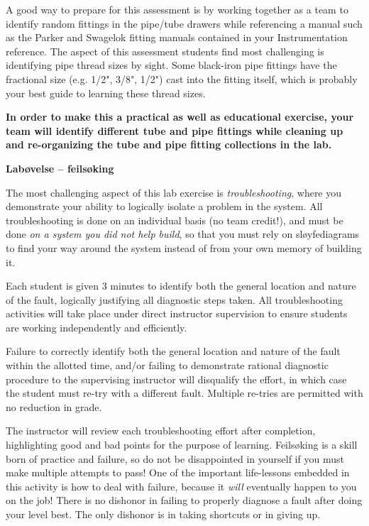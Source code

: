{{\vskip 10pt

A good way to prepare for this assessment is by working together as a team to identify random fittings in the pipe/tube drawers while referencing a manual such as the Parker and Swagelok fitting manuals contained in your Instrumentation reference.  The aspect of this assessment students find most challenging is identifying pipe thread sizes by sight.  Some black-iron pipe fittings have the fractional size (e.g. 1/2", 3/8", 1/2") cast into the fitting itself, which is probably your best guide to learning these thread sizes.

\vskip 10pt

{\bf In order to make this a practical as well as educational exercise, your team will identify different tube and pipe fittings while cleaning up and re-organizing the tube and pipe fitting collections in the lab.}  

\vskip 10pt






\vfil \eject

\noindent
{\bf Labøvelse -- feilsøking}

\vskip 5pt

The most challenging aspect of this lab exercise is {\it troubleshooting}, where you demonstrate your ability to logically isolate a problem in the system.  All troubleshooting is done on an individual basis (no team credit!), and must be done {\it on a system you did not help build}, so that you must rely on sløyfediagrams to find your way around the system instead of from your own memory of building it.

Each student is given 3 minutes to identify both the general location and nature of the fault, logically justifying all diagnostic steps taken.  All troubleshooting activities will take place under direct instructor supervision to ensure students are working independently and efficiently. 

Failure to correctly identify both the general location and nature of the fault within the allotted time, and/or failing to demonstrate rational diagnostic procedure to the supervising instructor will disqualify the effort, in which case the student must re-try with a different fault.  Multiple re-tries are permitted with no reduction in grade.

The instructor will review each troubleshooting effort after completion, highlighting good and bad points for the purpose of learning.  Feilsøking is a skill born of practice and failure, so do not be disappointed in yourself if you must make multiple attempts to pass!  One of the important life-lessons embedded in this activity is how to deal with failure, because it {\it will} eventually happen to you on the job!  There is no dishonor in failing to properly diagnose a fault after doing your level best.  The only dishonor is in taking shortcuts or in giving up.

}}
